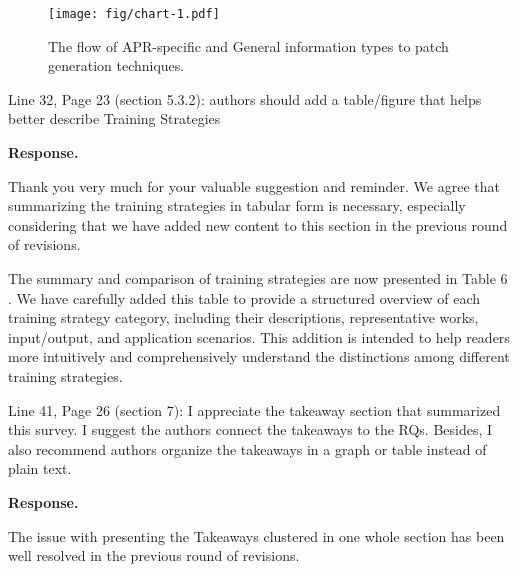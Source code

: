 \documentclass[acmsmall]{acmart}
\begin{document}
	\begin{figure}[t!]
		\centering
		\texttt{[image: fig/chart-1.pdf]}
		\caption{The flow of APR-specific and General information types to patch generation
		techniques.}
		\label{f:flow}
	\end{figure}

	\begin{tcolorbox}
		[commentbox,title=Reviewer \#2 - Comment 7] Line 32, Page 23 (section 5.3.2): authors should
		add a table/figure that helps better describe Training Strategies
	\end{tcolorbox}

	\noindent
	\textbf{Response.}

	Thank you very much for your valuable suggestion and reminder. We agree that summarizing the training
	strategies in tabular form is necessary, especially considering that we have added new content
	to this section in the previous round of revisions.

	The summary and comparison of training strategies are now presented in
	\color{red}
	Table 6
	\color{black}
	. We have carefully added this table to provide a structured overview of each training strategy
	category, including their descriptions, representative works, input/output, and application
	scenarios. This addition is intended to help readers more intuitively and comprehensively understand
	the distinctions among different training strategies.

	\begin{tcolorbox}
		[commentbox,title=Reviewer \#2 - Comment 8] Line 41, Page 26 (section 7): I appreciate the
		takeaway section that summarized this survey. I suggest the authors connect the takeaways to
		the RQs. Besides, I also recommend authors organize the takeaways in a graph or table instead
		of plain text.
	\end{tcolorbox}

	\noindent
	\textbf{Response.}

	The issue with presenting the Takeaways clustered in one whole section has been well resolved in
	the previous round of revisions.

	
	
\end{document}
